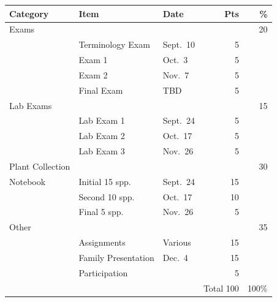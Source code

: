 \documentclass{tufte-handout}
\begin{document}
\begin{table}
\begin{tabular}{l l l r r}
Category & Item & Date &  Pts & \% \\
\hline
Exams & & & & 20 \\
& Terminology Exam & Sept.~10 & 5\\
& Exam 1 & Oct.~3  & 5 \\
& Exam 2 & Nov.~7  & 5 \\
& Final Exam & TBD & 5 \\ 
\hline
Lab Exams & & & & 15\\
& Lab Exam 1 & Sept.~24  & 5 \\
& Lab Exam 2 & Oct.~17 & 5 \\
& Lab Exam 3 & Nov.~26  & 5 \\ 	
\hline
Plant Collection & & & & 30 \\
Notebook & Initial 15 spp. & Sept.~24 & 15 \\
& Second 10 spp. & Oct.~17 & 10 \\
& Final 5 spp. & Nov.~26 & 5 \\
\hline 
Other & & & & 35 \\
& Assignments & Various & 15 \\
& Family Presentation & Dec.~4 & 15 \\
 & Participation &  & 5 \\
\hline
& & & Total 100 & 100\%
\end{tabular}
\end{table}
\end{document}

